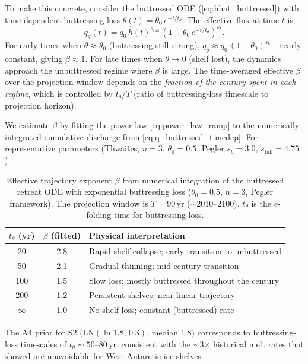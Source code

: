 \documentclass[11pt]{article}
\newcommand{\qg}{q_g}
\newcommand{\hhat}{\hat{h}}
\begin{document}
To make this concrete, consider the buttressed ODE (\cref{eq:hhat_buttressed}) with time-dependent buttressing loss $\theta(t) = \theta_0\,e^{-t/t_\theta}$. The effective flux at time $t$ is
\begin{equation}
	\qg(t) = q_0\,\hhat(t)^{s_{\mathrm{full}}}\,(1 - \theta_0\,e^{-t/t_\theta})^{s_b}.
	\label{eq:q_buttressed_timedep}
\end{equation}
For early times when $\theta \approx \theta_0$ (buttressing still strong), $\qg \approx q_0\,(1-\theta_0)^{s_b}$---nearly constant, giving $\beta \approx 1$. For late times when $\theta \to 0$ (shelf lost), the dynamics approach the unbuttressed regime where $\beta$ is large. The time-averaged effective $\beta$ over the projection window depends on the \emph{fraction of the century spent in each regime}, which is controlled by $t_\theta/T$ (ratio of buttressing-loss timescale to projection horizon).

We estimate $\beta$ by fitting the power law \cref{eq:power_law_ramp} to the numerically integrated cumulative discharge from \cref{eq:q_buttressed_timedep}. For representative parameters (Thwaites, $n=3$, $\theta_0 = 0.5$, Pegler $s_b = 3.0$, $s_{\mathrm{full}} = 4.75$):

\begin{table}[ht]
\centering
\caption{Effective trajectory exponent $\beta$ from numerical integration of the buttressed retreat ODE with exponential buttressing loss ($\theta_0 = 0.5$, $n = 3$, Pegler framework). The projection window is $T = 90$\,yr ($\sim$2010--2100). $t_\theta$ is the $e$-folding time for buttressing loss.}
\label{tab:beta_vs_tau}
\smallskip
\begin{tabular}{c c l}
\toprule
$t_\theta$ (yr) & $\beta$ (fitted) & Physical interpretation \\
\midrule
20   & 2.8 & Rapid shelf collapse; early transition to unbuttressed \\
50   & 2.1 & Gradual thinning; mid-century transition \\
100  & 1.5 & Slow loss; mostly buttressed throughout the century \\
200  & 1.2 & Persistent shelves; near-linear trajectory \\
$\infty$ & 1.0 & No shelf loss; constant (buttressed) rate \\
\bottomrule
\end{tabular}
\end{table}

The A4 prior for S2 ($\mathrm{LN}(\ln 1.8,\, 0.3)$, median 1.8) corresponds to buttressing-loss timescales of $t_\theta \sim 50$--80\,yr, consistent with the $\sim$3$\times$ historical melt rates that \citet{Naughten2023} showed are unavoidable for West Antarctic ice shelves.
\end{document}
